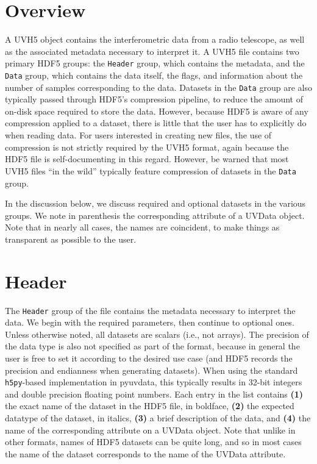 \documentclass[11pt, oneside]{article}
\begin{document}
\section{Overview}
\label{sec:overview}
A UVH5 object contains the interferometric data from a radio telescope, as well
as the associated metadata necessary to interpret it. A UVH5 file contains two
primary HDF5 groups: the \verb+Header+ group, which contains the metadata, and
the \verb+Data+ group, which contains the data itself, the flags, and
information about the number of samples corresponding to the data. Datasets in
the \verb+Data+ group are also typically passed through HDF5's compression
pipeline, to reduce the amount of on-disk space required to store the data.
However, because HDF5 is aware of any compression applied to a dataset, there is
little that the user has to explicitly do when reading data. For users
interested in creating new files, the use of compression is not strictly
required by the UVH5 format, again because the HDF5 file is self-documenting in
this regard. However, be warned that most UVH5 files ``in the wild'' typically
feature compression of datasets in the \verb+Data+ group.

In the discussion below, we discuss required and optional datasets in the
various groups. We note in parenthesis the corresponding attribute of a UVData
object. Note that in nearly all cases, the names are coincident, to make things
as transparent as possible to the user.

\section{Header}
\label{sec:header}
The \verb+Header+ group of the file contains the metadata necessary to interpret
the data. We begin with the required parameters, then continue to optional
ones. Unless otherwise noted, all datasets are scalars (i.e., not arrays). The
precision of the data type is also not specified as part of the format, because
in general the user is free to set it according to the desired use case (and
HDF5 records the precision and endianness when generating datasets). When using
the standard \verb+h5py+-based implementation in pyuvdata, this typically
results in 32-bit integers and double precision floating point numbers. Each
entry in the list contains \textbf{(1)} the exact name of the dataset in the
HDF5 file, in boldface, \textbf{(2)} the expected datatype of the dataset, in
italics, \textbf{(3)} a brief description of the data, and \textbf{(4)} the name
of the corresponding attribute on a UVData object. Note that unlike in other
formats, names of HDF5 datasets can be quite long, and so in most cases the name
of the dataset corresponds to the name of the UVData attribute.
\end{document}
